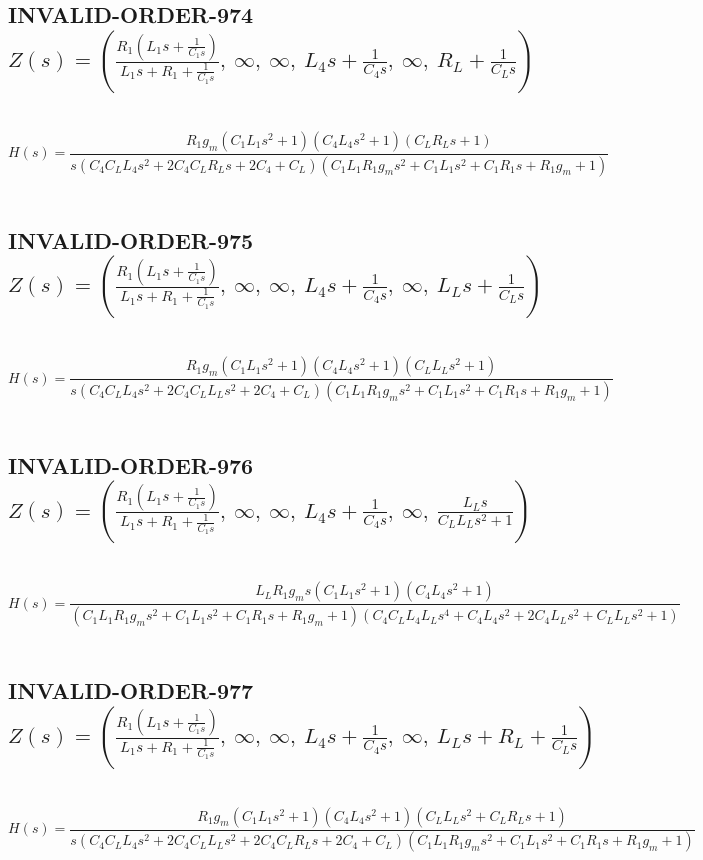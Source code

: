 \documentclass{article}
\begin{document}
\subsection{INVALID-ORDER-974 $Z(s) = \left( \frac{R_{1} \left(L_{1} s + \frac{1}{C_{1} s}\right)}{L_{1} s + R_{1} + \frac{1}{C_{1} s}}, \  \infty, \  \infty, \  L_{4} s + \frac{1}{C_{4} s}, \  \infty, \  R_{L} + \frac{1}{C_{L} s}\right)$ } \ 
\textbf{\[H(s) = \frac{R_{1} g_{m} \left(C_{1} L_{1} s^{2} + 1\right) \left(C_{4} L_{4} s^{2} + 1\right) \left(C_{L} R_{L} s + 1\right)}{s \left(C_{4} C_{L} L_{4} s^{2} + 2 C_{4} C_{L} R_{L} s + 2 C_{4} + C_{L}\right) \left(C_{1} L_{1} R_{1} g_{m} s^{2} + C_{1} L_{1} s^{2} + C_{1} R_{1} s + R_{1} g_{m} + 1\right)}\] } \ 
\subsection{INVALID-ORDER-975 $Z(s) = \left( \frac{R_{1} \left(L_{1} s + \frac{1}{C_{1} s}\right)}{L_{1} s + R_{1} + \frac{1}{C_{1} s}}, \  \infty, \  \infty, \  L_{4} s + \frac{1}{C_{4} s}, \  \infty, \  L_{L} s + \frac{1}{C_{L} s}\right)$ } \ 
\textbf{\[H(s) = \frac{R_{1} g_{m} \left(C_{1} L_{1} s^{2} + 1\right) \left(C_{4} L_{4} s^{2} + 1\right) \left(C_{L} L_{L} s^{2} + 1\right)}{s \left(C_{4} C_{L} L_{4} s^{2} + 2 C_{4} C_{L} L_{L} s^{2} + 2 C_{4} + C_{L}\right) \left(C_{1} L_{1} R_{1} g_{m} s^{2} + C_{1} L_{1} s^{2} + C_{1} R_{1} s + R_{1} g_{m} + 1\right)}\] } \ 
\subsection{INVALID-ORDER-976 $Z(s) = \left( \frac{R_{1} \left(L_{1} s + \frac{1}{C_{1} s}\right)}{L_{1} s + R_{1} + \frac{1}{C_{1} s}}, \  \infty, \  \infty, \  L_{4} s + \frac{1}{C_{4} s}, \  \infty, \  \frac{L_{L} s}{C_{L} L_{L} s^{2} + 1}\right)$ } \ 
\textbf{\[H(s) = \frac{L_{L} R_{1} g_{m} s \left(C_{1} L_{1} s^{2} + 1\right) \left(C_{4} L_{4} s^{2} + 1\right)}{\left(C_{1} L_{1} R_{1} g_{m} s^{2} + C_{1} L_{1} s^{2} + C_{1} R_{1} s + R_{1} g_{m} + 1\right) \left(C_{4} C_{L} L_{4} L_{L} s^{4} + C_{4} L_{4} s^{2} + 2 C_{4} L_{L} s^{2} + C_{L} L_{L} s^{2} + 1\right)}\] } \ 
\subsection{INVALID-ORDER-977 $Z(s) = \left( \frac{R_{1} \left(L_{1} s + \frac{1}{C_{1} s}\right)}{L_{1} s + R_{1} + \frac{1}{C_{1} s}}, \  \infty, \  \infty, \  L_{4} s + \frac{1}{C_{4} s}, \  \infty, \  L_{L} s + R_{L} + \frac{1}{C_{L} s}\right)$ } \ 
\textbf{\[H(s) = \frac{R_{1} g_{m} \left(C_{1} L_{1} s^{2} + 1\right) \left(C_{4} L_{4} s^{2} + 1\right) \left(C_{L} L_{L} s^{2} + C_{L} R_{L} s + 1\right)}{s \left(C_{4} C_{L} L_{4} s^{2} + 2 C_{4} C_{L} L_{L} s^{2} + 2 C_{4} C_{L} R_{L} s + 2 C_{4} + C_{L}\right) \left(C_{1} L_{1} R_{1} g_{m} s^{2} + C_{1} L_{1} s^{2} + C_{1} R_{1} s + R_{1} g_{m} + 1\right)}\] } \ 
\end{document}
